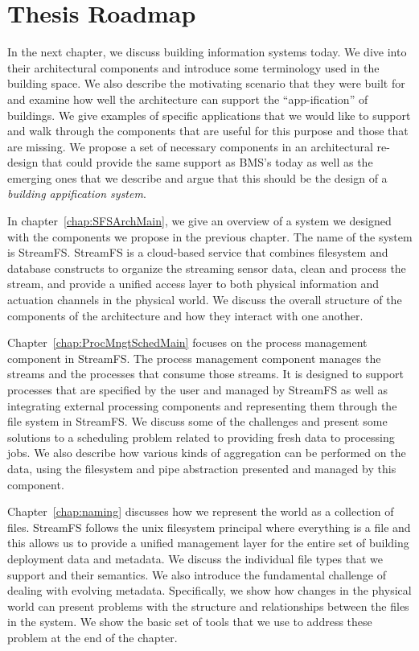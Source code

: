 \section{Thesis Roadmap}
In the next chapter, we discuss building information systems today.  We dive into their architectural components and introduce some terminology
used in the building space.  We also describe the motivating scenario that they were built for and examine how well the architecture 
can support the ``app-ification'' of buildings.  We give examples of specific applications that we would like to support
and walk through the components that are useful for this purpose and those that are missing.  We propose a set of necessary
components in an architectural re-design that could provide the same support as BMS's today as well as the emerging ones that we
describe and argue that this should be the design of a \emph{building appification system}.

In chapter~\ref{chap:SFSArchMain}, we give an overview of a system we designed with the components we propose in the previous
chapter.  The name of the system is StreamFS. StreamFS is a cloud-based service that combines filesystem and database constructs
to organize the streaming sensor data, clean and process the stream, and provide a unified access layer to both physical information
and actuation channels in the physical world.  We discuss the overall structure of the components of the architecture and how
they interact with one another.

Chapter~\ref{chap:ProcMngtSchedMain} focuses on the process management component in StreamFS.  The process management component
manages the streams and the processes that consume those streams.  It is designed to support processes that are specified by the user
and managed by StreamFS as well as integrating external processing components and representing them through the file system in StreamFS.
We discuss some of the challenges and present some solutions to a scheduling problem related to providing fresh data  to processing jobs.
We also describe how various kinds of aggregation can be performed on the data, using the filesystem and pipe abstraction
presented and managed by this component.


Chapter~\ref{chap:naming} discusses how we represent the world as a collection of files.  StreamFS follows the unix filesystem principal 
where everything is a file and this allows us to provide a unified management layer for the entire set of building deployment
data and metadata.  We discuss the individual file types that we support and their semantics.  We also introduce the fundamental
challenge of dealing with evolving metadata.  Specifically,  we show how changes in the physical world can present problems
with the structure and relationships between the files in the system.  We show the basic set of tools that we use to address these problem
at the end of the chapter.

